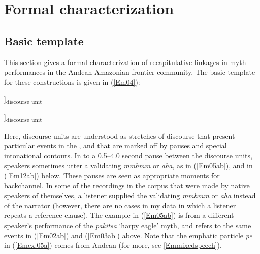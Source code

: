 \documentclass[output=paper]{LSP/langsci}
\begin{document}
\section{ Formal characterization}
\label{Emformal}
\subsection{Basic template}
\label{Embasic}
This section gives a formal characterization of recapitulative linkages in  myth performances in the Andean-Amazonian frontier community. The basic template for these constructions is given in (\ref{Em04}): 
 

\begin{exe}
\ex \label{Em04}
\glt [...[\underline{Reference clause}]]\textsubscript{discourse unit}


\glt[[\textbf{Bridging clause}] [Discourse-new information]]\textsubscript{discourse unit}\\
\end{exe}



Here, discourse units are understood as stretches of discourse that present particular events in the , and that are marked off by pauses and special intonational contours. In  to a 0.5--4.0 second pause between the discourse units, speakers sometimes utter a validating \textit{mmhmm} or \textit{aha}, as in (\ref{Em05ab}), and in (\ref{Em12ab}) below. These pauses are seen as appropriate moments for backchannel. In some of the recordings in the corpus that were made by native speakers of  themselves, a listener supplied the validating \textit{mmhmm} or \textit{aha} instead of the narrator (however, there are no cases in my data in which a listener repeats a reference clause). The example in (\ref{Em05ab}) is from a different speaker’s performance of the \textit{pakitsa} `harpy eagle' myth, and refers to the same events in (\ref{Em02ab}) and (\ref{Em03ab}) above. Note that the emphatic particle \textit{pe} in (\ref{Emex:05a}) comes from Andean  (for more, see \ref{Emmixedspeech}).
\end{document}
